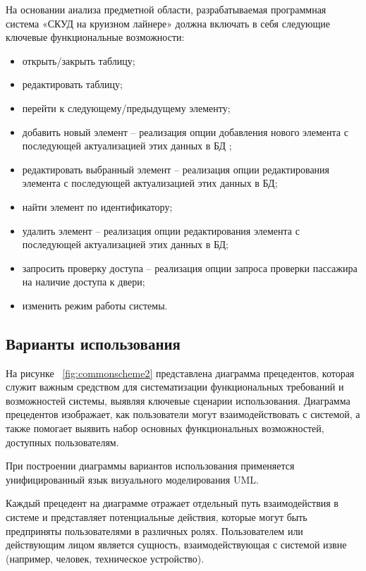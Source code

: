 На основании анализа предметной области, разрабатываемая программная система «СКУД на круизном лайнере» должна включать в себя следующие ключевые функциональные возможности:
\begin{itemize}
	\item открыть/закрыть таблицу;
	\item редактировать таблицу;
	\item перейти к следующему/предыдущему элементу;
	\item добавить новый элемент -- реализация опции добавления нового элемента с последующей актуализацией этих данных в БД ;
	\item редактировать выбранный элемент -- реализация опции редактирования элемента с последующей актуализацией этих данных в БД;
	\item найти элемент по идентификатору;
	\item удалить элемент -- реализация опции редактирования элемента с последующей актуализацией этих данных в БД;
	\item запросить проверку доступа -- реализация опции запроса проверки пассажира на наличие доступа к двери;
	\item изменить режим работы системы.
\end{itemize}

\subsection{Варианты использования}

На рисунке  ~\ref{fig:commonscheme2} представлена диаграмма прецедентов, которая служит важным средством для систематизации функциональных требований и возможностей системы, выявляя ключевые сценарии использования. Диаграмма прецедентов изображает, как пользователи могут взаимодействовать с системой, а также помогает выявить набор основных функциональных возможностей, доступных пользователям.

При построении диаграммы вариантов использования применяется унифицированный язык визуального моделирования UML.

Каждый прецедент на диаграмме отражает отдельный путь взаимодействия в системе и представляет потенциальные действия, которые могут быть предприняты пользователями в различных ролях. Пользователем или действующим лицом является сущность, взаимодействующая с системой извне (например, человек, техническое устройство).

